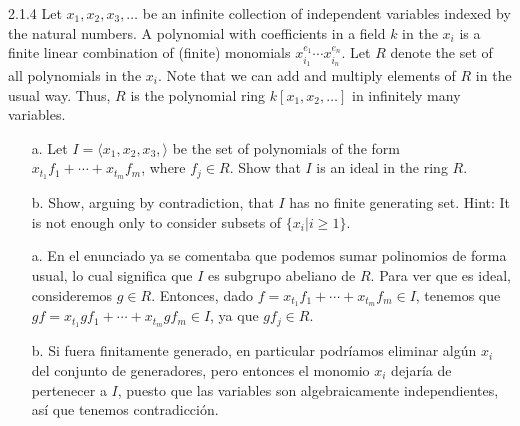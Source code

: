 \documentclass[twoside]{article}
\begin{document}
\begin{ejercicio}{2.1.4}
Let $x_1, x_2, x_3,\dots$  be an infinite collection of independent variables indexed by the natural
numbers. A polynomial with coefficients in a field $k$ in the $x_i$ is a finite linear combination
of (finite) monomials $x^{e_1}_{i_1}\cdots x^{e_n}_{i_n}$. Let $R$ denote the set of all polynomials in the $x_i$. Note that
we can add and multiply elements of $R$ in the usual way. Thus, $R$ is the polynomial ring
$k[x_1, x_2,\dots]$ in infinitely many variables.
\begin{itemize}
\item[a.] Let $I = 
\langle x_1, x_2, x_3,\rangle$ be the set of polynomials of the form $x_{t_1} f_1+\cdots+x_{t_m} f_m$, where
$f_j ∈ R$. Show that $I$ is an ideal in the ring $R$.
\item[b.] Show, arguing by contradiction, that $I$ has no finite generating set. Hint: It is not enough
only to consider subsets of $\{x_i | i ≥ 1\}$.
\end{itemize}
\end{ejercicio}
\begin{solucion}
\begin{itemize}
\item[a.] En el enunciado ya se comentaba que podemos sumar polinomios de forma usual, lo cual significa que $I$ es subgrupo abeliano de $R$. Para ver que es ideal, consideremos $g\in R$. Entonces, dado $f= x_{t_1} f_1+\cdots+x_{t_m} f_m\in I$, tenemos que $gf=x_{t_1}g f_1+\cdots+x_{t_m}g f_m\in I$, ya que $gf_j\in R$. 
\item[b.] Si fuera finitamente generado, en particular podríamos eliminar algún $x_i$ del conjunto de generadores, pero entonces el monomio $x_i$ dejaría de pertenecer a $I$, puesto que las variables son algebraicamente independientes, así que tenemos contradicción. 
\end{itemize}
\end{solucion}
\end{document}
